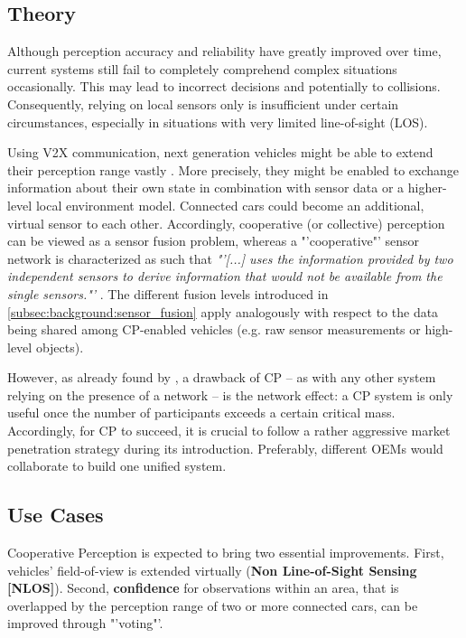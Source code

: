 \subsection{Theory}
\label{subsec:background:theory}
Although perception accuracy and reliability have greatly improved over time, current systems still fail to completely comprehend complex situations occasionally. This may lead to incorrect decisions and potentially to collisions. Consequently, relying on local sensors only is insufficient under certain circumstances, especially in situations with very limited line-of-sight (LOS).

Using V2X communication, next generation vehicles might be able to extend their perception range vastly \cite{Chen2019, Hohm2019}. More precisely, they might be enabled to exchange information about their own state in combination with sensor data or a higher-level local environment model. Connected cars could become an additional, virtual sensor to each other. Accordingly, cooperative (or collective) perception can be viewed as a sensor fusion problem, whereas a "'cooperative"' sensor network is characterized as such that \textit{"'[...] uses the information provided by two independent sensors to derive information that would not be available from the single sensors."'} \cite{Elmenreich2002}. The different fusion levels introduced in \cref{subsec:background:sensor_fusion} apply analogously with respect to the data being shared among CP-enabled vehicles (e.g. raw sensor measurements or high-level objects).

However, as already found by \cite{Gunther2015}, a drawback of CP – as with any other system relying on the presence of a network – is the network effect: a CP system is only useful once the number of participants exceeds a certain critical mass. Accordingly, for CP to succeed, it is crucial to follow a rather aggressive market penetration strategy during its introduction. Preferably, different OEMs would collaborate to build one unified system.

\subsection{Use Cases}
\label{subsec:background:use_cases}
Cooperative Perception is expected to bring two essential improvements. First, vehicles' field-of-view is extended virtually (\textbf{Non Line-of-Sight Sensing [NLOS]}). Second, \textbf{confidence} for observations within an area, that is overlapped by the perception range of two or more connected cars, can be improved through "'voting"'.

